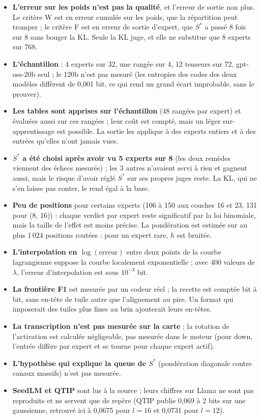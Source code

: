 \begin{faux}
\begin{itemize}
\item \textbf{L'erreur sur les poids n'est pas la qualité}, et l'erreur de sortie non plus. Le critère W est en erreur cumulée sur les poids, que la répartition peut tromper ; le critère F est en erreur de sortie d'expert, que $S^{*}$ a passé 8 fois sur 8 sans bouger la KL. Seule la KL juge, et elle ne substitue que 8 experts sur 768.
\item \textbf{L'échantillon} : 4 experts sur 32, une rangée sur 4, 12 tenseurs sur 72, gpt-oss-20b seul ; le 120b n'est pas mesuré (les entropies des codes des deux modèles diffèrent de 0,001 bit, ce qui rend un grand écart improbable, sans le prouver).
\item \textbf{Les tables sont apprises sur l'échantillon} (48 rangées par expert) et évaluées aussi sur ces rangées ; leur coût est compté, mais un léger sur-apprentissage est possible. La sortie les applique à des experts entiers et à des entrées qu'elles n'ont jamais vues.
\item \textbf{$S^{*}$ a été choisi après avoir vu 5 experts sur 8} (les deux remèdes viennent des échecs mesurés) ; les 3 autres n'avaient servi à rien et gagnent aussi, mais le risque d'avoir réglé $S^{*}$ sur ses propres juges reste. La KL, qui ne s'en laisse pas conter, le rend égal à la base.
\item \textbf{Peu de positions} pour certains experts (106 à 150 aux couches 16 et 23, 131 pour (8, 16)) : chaque verdict par expert reste significatif par la loi binomiale, mais la taille de l'effet est moins précise. La pondération est estimée sur au plus 1\,024 positions routées : pour un expert rare, $h$ est bruitée.
\item \textbf{L'interpolation en $\log(\text{erreur})$} entre deux points de la courbe lagrangienne suppose la courbe localement exponentielle ; avec 400 valeurs de $\lambda$, l'erreur d'interpolation est sous $10^{-3}$ bit.
\item \textbf{La frontière F1} est mesurée par un codeur réel ; la recette est comptée bit à bit, sans en-tête de tuile autre que l'alignement au pire. Un format qui imposerait des tuiles plus fines au brin ajouterait leurs en-têtes.
\item \textbf{La transcription n'est pas mesurée sur la carte} ; la rotation de l'activation est calculée négligeable, pas mesurée dans le moteur (pour down, l'entrée diffère par expert et se tourne pour chaque expert actif).
\item \textbf{L'hypothèse qui explique la queue de $S^{*}$} (pondération diagonale contre canaux massifs) n'est pas mesurée.
\item \textbf{SeedLM et QTIP} sont lus à la source ; leurs chiffres sur Llama ne sont pas reproduits et ne servent que de repère (QTIP publie 0,069 à 2 bits sur une gaussienne, retrouvé ici à 0,0675 pour $l = 16$ et 0,0731 pour $l = 12$).
\end{itemize}
\end{faux}

